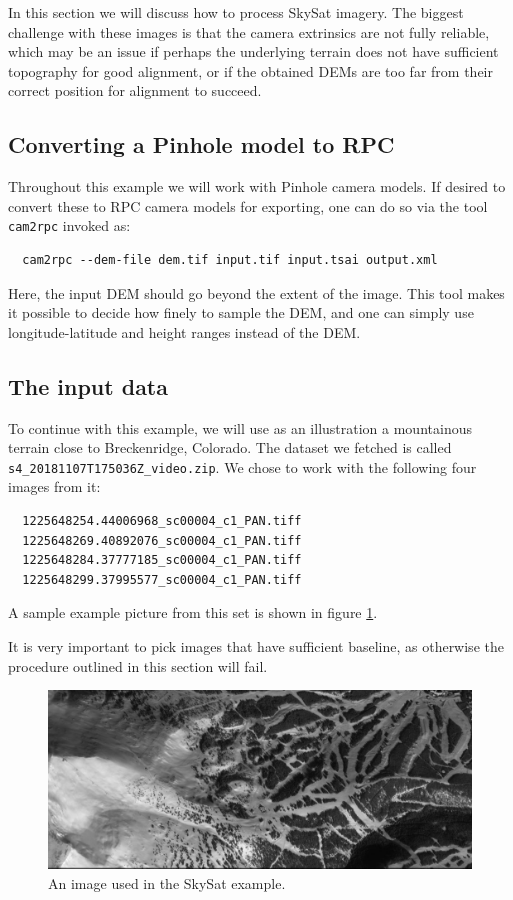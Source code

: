 In this section we will discuss how to process SkySat imagery. The
biggest challenge with these images is that the camera extrinsics are
not fully reliable, which may be an issue if perhaps the underlying
terrain does not have sufficient topography for good alignment, or if
the obtained DEMs are too far from their correct position for alignment
to succeed.

\subsection{Converting a Pinhole model to RPC}
Throughout this example we will work with Pinhole camera models. If desired to convert these
to RPC camera models for exporting, one can do so via the tool \texttt{cam2rpc} invoked as:

\begin{verbatim}
  cam2rpc --dem-file dem.tif input.tif input.tsai output.xml 
\end{verbatim}
Here, the input DEM should go beyond the extent of the image.
This tool makes it possible to decide how finely to sample the DEM, and one can simply use
longitude-latitude and height ranges instead of the DEM. 

\subsection{The input data}

To continue with this example, we will use as an illustration a
mountainous terrain close to Breckenridge, Colorado. The dataset we
fetched is called \texttt{s4\_20181107T175036Z\_video.zip}. We chose to
work with the following four images from it:

\begin{verbatim}
  1225648254.44006968_sc00004_c1_PAN.tiff
  1225648269.40892076_sc00004_c1_PAN.tiff
  1225648284.37777185_sc00004_c1_PAN.tiff
  1225648299.37995577_sc00004_c1_PAN.tiff
\end{verbatim}

A sample example picture from this set is shown in figure \ref{skysat-example}.

It is very important to pick images that have sufficient baseline, as otherwise 
the procedure outlined in this section will fail. 

\begin{figure}[h!]
\centering
\includegraphics[width=5.0in]{images/Breckenridge.jpg}
\caption{An image used in the SkySat example.}
\label{skysat-example}
\end{figure}

